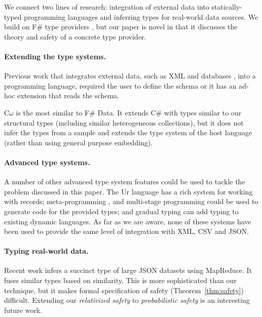 \documentclass[10pt,preprint,blind,clearpagebib]{sigplanconf}
\begin{document}
We connect two lines of research: integration of external data into statically-typed 
programming languages and inferring types for real-world data sources. We build on F\# type 
providers \cite{fsharp-typeprov,fsharp-typeprov-ddfp,idris-tp,liteq}, but our paper is novel 
in that it discusses the theory and safety of a concrete type provider. 

\paragraph{Extending the type systems.} 
Previous work that integrates external data, such as XML \cite{xduce,xduce-ml} and databases 
\cite{links,linq}, into a programming language, required the user to define the schema
or it has an ad-hoc extension that reads the schema.

C$\omega$ \cite{comega-xs} is the most similar to F\# Data. It extends C\# with types similar to our
structural types (including similar heterogeneous collections), but it does not infer the types
from a sample and extends the type system of the host language (rather than using general purpose
embedding).

\paragraph{Advanced type systems.}
A number of other advanced type system features could be used to tackle the problem discussed 
in this paper. The Ur \cite{ur} language has a rich system for working with records; 
meta-programming \cite{template-hask}, \cite{th-camlp4} and multi-stage programming \cite{multi-stage}
could be used to generate code for the provided types; and gradual typing \cite{gradual,gradual-js} 
can add typing to existing dynamic languages. As far as we are aware, none of these 
systems have been used to provide the same level of integration with XML, CSV and JSON.

\paragraph{Typing real-world data.}
Recent work \cite{typing-json} infers a succinct type of large JSON datasets using MapReduce.
It fuses similar types based on similarity. This is more sophisticated than our technique, but it 
makes formal specification of safety (Theorem~\ref{thm:safety}) difficult. Extending our 
\emph{relativized safety} to \emph{probabilistic safety} is an interesting future work.
\end{document}
